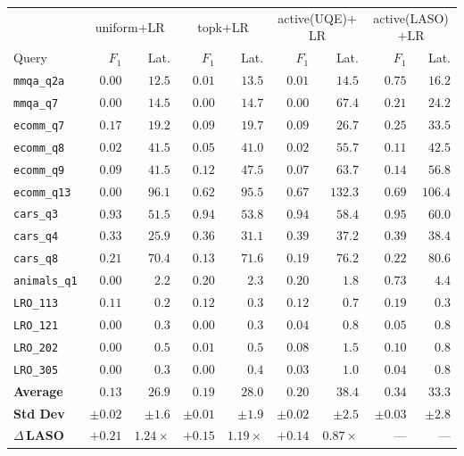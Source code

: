 \begin{tabular}{@{}l rr rr rr rr@{}}
\toprule
& \multicolumn{2}{c}{uniform$+$LR} & \multicolumn{2}{c}{topk$+$LR} & \multicolumn{2}{c}{active(UQE)$+$LR} & \multicolumn{2}{c}{active(LASO)$+$LR} \\
\cmidrule(lr){2-3} \cmidrule(lr){4-5} \cmidrule(lr){6-7} \cmidrule(lr){8-9}
Query & $F_1$ & Lat. & $F_1$ & Lat. & $F_1$ & Lat. & $F_1$ & Lat. \\
\midrule
\texttt{mmqa\_q2a}   & $0.00$ & $12.5$ & $0.01$ & $13.5$ & $0.01$ & $14.5$ & $\mathbf{0.75}$ & $16.2$ \\
\texttt{mmqa\_q7}    & $0.00$ & $14.5$ & $0.00$ & $14.7$ & $0.00$ & $67.4$ & $\mathbf{0.21}$ & $24.2$ \\
\texttt{ecomm\_q7}   & $0.17$ & $19.2$ & $0.09$ & $19.7$ & $0.09$ & $26.7$ & $\mathbf{0.25}$ & $33.5$ \\
\texttt{ecomm\_q8}   & $0.02$ & $41.5$ & $0.05$ & $41.0$ & $0.02$ & $55.7$ & $\mathbf{0.11}$ & $42.5$ \\
\texttt{ecomm\_q9}   & $0.09$ & $41.5$ & $0.12$ & $47.5$ & $0.07$ & $63.7$ & $\mathbf{0.14}$ & $56.8$ \\
\texttt{ecomm\_q13}  & $0.00$ & $96.1$ & $0.62$ & $95.5$ & $0.67$ & $132.3$ & $\mathbf{0.69}$ & $106.4$ \\
\texttt{cars\_q3}    & $0.93$ & $51.5$ & $0.94$ & $53.8$ & $0.94$ & $58.4$ & $\mathbf{0.95}$ & $60.0$ \\
\texttt{cars\_q4}    & $0.33$ & $25.9$ & $0.36$ & $31.1$ & $\mathbf{0.39}$ & $37.2$ & $0.39$ & $38.4$ \\
\texttt{cars\_q8}    & $0.21$ & $70.4$ & $0.13$ & $71.6$ & $0.19$ & $76.2$ & $\mathbf{0.22}$ & $80.6$ \\
\texttt{animals\_q1} & $0.00$ & $2.2$ & $0.20$ & $2.3$ & $0.20$ & $1.8$ & $\mathbf{0.73}$ & $4.4$ \\
\texttt{LRO\_113}    & $0.11$ & $0.2$ & $0.12$ & $0.3$ & $0.12$ & $0.7$ & $\mathbf{0.19}$ & $0.3$ \\
\texttt{LRO\_121}    & $0.00$ & $0.3$ & $0.00$ & $0.3$ & $0.04$ & $0.8$ & $\mathbf{0.05}$ & $0.8$ \\
\texttt{LRO\_202}    & $0.00$ & $0.5$ & $0.01$ & $0.5$ & $0.08$ & $1.5$ & $\mathbf{0.10}$ & $0.8$ \\
\texttt{LRO\_305}    & $0.00$ & $0.3$ & $0.00$ & $0.4$ & $0.03$ & $1.0$ & $\mathbf{0.04}$ & $0.8$ \\
\midrule
\textbf{Average}      & $0.13$ & $26.9$ & $0.19$ & $28.0$ & $0.20$ & $38.4$ & $\mathbf{0.34}$ & $33.3$ \\
\textbf{Std Dev}      & $\pm0.02$ & $\pm1.6$ & $\pm0.01$ & $\pm1.9$ & $\pm0.02$ & $\pm2.5$ & $\pm0.03$ & $\pm2.8$ \\
\midrule
\textbf{$\Delta$\,LASO} & $+0.21$ & $1.24\times$ & $+0.15$ & $1.19\times$ & $+0.14$ & $0.87\times$ & --- & --- \\
\bottomrule
\end{tabular}
